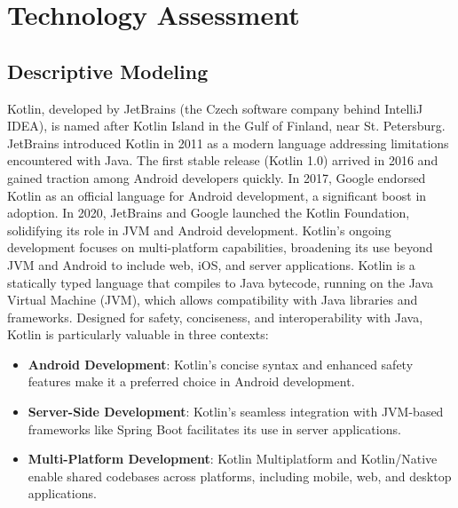 \section{Technology Assessment}
\label{sec:technology}

\subsection{Descriptive Modeling}

Kotlin, developed by JetBrains (the Czech software company behind IntelliJ IDEA), is named after Kotlin Island in the Gulf of Finland, near St. Petersburg. JetBrains introduced Kotlin in 2011 as a modern language addressing limitations encountered with Java. The first stable release (Kotlin 1.0) arrived in 2016 and gained traction among Android developers quickly. In 2017, Google endorsed Kotlin as an official language for Android development, a significant boost in adoption. In 2020, JetBrains and Google launched the Kotlin Foundation, solidifying its role in JVM and Android development. Kotlin’s ongoing development focuses on multi-platform capabilities, broadening its use beyond JVM and Android to include web, iOS, and server applications. Kotlin is a statically typed language that compiles to Java bytecode, running on the Java Virtual Machine (JVM), which allows compatibility with Java libraries and frameworks. Designed for safety, conciseness, and interoperability with Java, Kotlin is particularly valuable in three contexts:

\begin{itemize}
    \item \textbf{Android Development}: Kotlin’s concise syntax and enhanced safety features make it a preferred choice in Android development.
    \item \textbf{Server-Side Development}: Kotlin’s seamless integration with JVM-based frameworks like Spring Boot facilitates its use in server applications.
    \item \textbf{Multi-Platform Development}: Kotlin Multiplatform and Kotlin/Native enable shared codebases across platforms, including mobile, web, and desktop applications.
\end{itemize}

